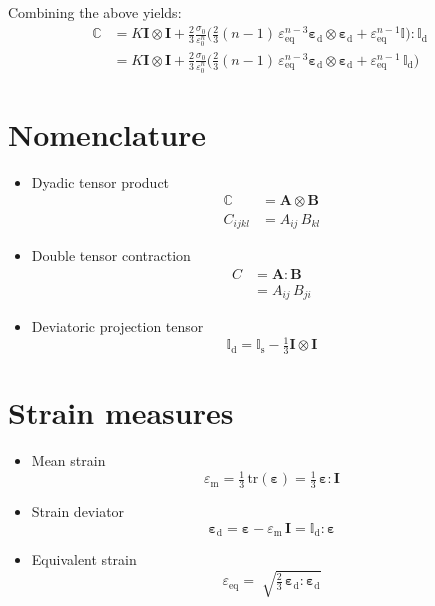 \documentclass[times,namecite]{goose-article}
\begin{document}
Combining the above yields:
\begin{align}
\mathbb{C}
&= K \bm{I} \otimes \bm{I} +
\frac{2}{3} \frac{\sigma_0}{\varepsilon_0^n}
\bigg(
  \tfrac{2}{3} (n-1) \, \varepsilon_\mathrm{eq}^{n-3}
  \bm{\varepsilon}_\mathrm{d} \otimes \bm{\varepsilon}_\mathrm{d}
  + \varepsilon_\mathrm{eq}^{n-1} \mathbb{I}
\bigg) : \mathbb{I}_\mathrm{d} \\
&= K \bm{I} \otimes \bm{I} +
\frac{2}{3} \frac{\sigma_0}{\varepsilon_0^n}
\bigg(
  \tfrac{2}{3} (n-1) \, \varepsilon_\mathrm{eq}^{n-3}
  \bm{\varepsilon}_\mathrm{d} \otimes \bm{\varepsilon}_\mathrm{d}
  + \varepsilon_\mathrm{eq}^{n-1} \, \mathbb{I}_\mathrm{d}
\bigg)
\end{align}

\appendix
\vfill\newpage

\section{Nomenclature}
\label{sec:nomenclature}

\begin{itemize}
%
\item Dyadic tensor product
\begin{align}
  \mathbb{C} &= \bm{A} \otimes \bm{B} \\
  C_{ijkl}   &= A_{ij} \,      B_{kl}
\end{align}
%
\item Double tensor contraction
\begin{align}
  C &= \bm{A} : \bm{B} \\
    &= A_{ij} \, B_{ji}
\end{align}
%
\item Deviatoric projection tensor
\begin{equation}
  \mathbb{I}_\mathrm{d}
  = \mathbb{I}_\mathrm{s} - \tfrac{1}{3} \bm{I} \otimes \bm{I}
\end{equation}
%
\end{itemize}

\section{Strain measures}
\label{sec:strain}

\begin{itemize}
%
\item Mean strain
\begin{equation}
  \varepsilon_\mathrm{m}
  = \tfrac{1}{3} \, \mathrm{tr} ( \bm{\varepsilon} )
  = \tfrac{1}{3} \, \bm{\varepsilon} : \bm{I}
\end{equation}
%
\item Strain deviator
\begin{equation}
  \bm{\varepsilon}_\mathrm{d}
  = \bm{\varepsilon} - \varepsilon_\mathrm{m} \, \bm{I}
  = \mathbb{I}_\mathrm{d} : \bm{\varepsilon}
\end{equation}
%
\item Equivalent strain
\begin{equation}
  \varepsilon_\mathrm{eq}
  = \; \sqrt{
    \tfrac{2}{3} \, \bm{\varepsilon}_\mathrm{d} : \bm{\varepsilon}_\mathrm{d}
  }
\end{equation}
%
\end{itemize}
\end{document}

